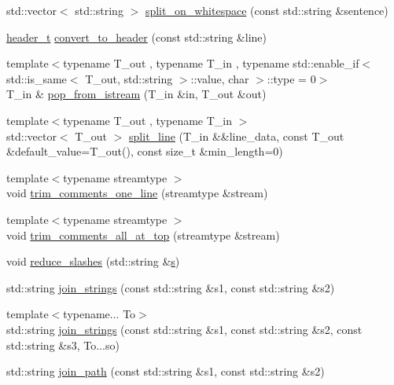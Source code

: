 \begin{DoxyCompactItemize}
\item 
std\+::vector$<$ std\+::string $>$ \hyperlink{namespaceIceBRG_aad40379211c58b53606d4bdb8bf7e4aa}{split\+\_\+on\+\_\+whitespace} (const std\+::string \&sentence)
\item 
\hyperlink{namespaceIceBRG_a49e8b48f1dbd351e9748e7cbe80705df}{header\+\_\+t} \hyperlink{namespaceIceBRG_a9f5dc0a1a78255329f619200e7dca2ac}{convert\+\_\+to\+\_\+header} (const std\+::string \&line)
\item 
{\footnotesize template$<$typename T\+\_\+out , typename T\+\_\+in , typename std\+::enable\+\_\+if$<$ std\+::is\+\_\+same$<$ T\+\_\+out, std\+::string $>$\+::value, char $>$\+::type  = 0$>$ }\\T\+\_\+in \& \hyperlink{namespaceIceBRG_a1ff20754fdcf67b62d9d29e53769f22f}{pop\+\_\+from\+\_\+istream} (T\+\_\+in \&in, T\+\_\+out \&out)
\item 
{\footnotesize template$<$typename T\+\_\+out , typename T\+\_\+in $>$ }\\std\+::vector$<$ T\+\_\+out $>$ \hyperlink{namespaceIceBRG_a7468ea3f83d5b2502eb12fd7894e4b59}{split\+\_\+line} (T\+\_\+in \&\&line\+\_\+data, const T\+\_\+out \&default\+\_\+value=T\+\_\+out(), const size\+\_\+t \&min\+\_\+length=0)
\item 
{\footnotesize template$<$typename streamtype $>$ }\\void \hyperlink{namespaceIceBRG_a349cf2523982e3a7dbbf85a19f7b2961}{trim\+\_\+comments\+\_\+one\+\_\+line} (streamtype \&stream)
\item 
{\footnotesize template$<$typename streamtype $>$ }\\void \hyperlink{namespaceIceBRG_acd00ce9e6eda20948b9394a63ef2f3c7}{trim\+\_\+comments\+\_\+all\+\_\+at\+\_\+top} (streamtype \&stream)
\item 
void \hyperlink{namespaceIceBRG_ae8113add7cad89108e48028787a7a41e}{reduce\+\_\+slashes} (std\+::string \&\hyperlink{namespaceIceBRG_ad0b9ada1ad5ccc9d88c2050483109e06}{s})
\item 
std\+::string \hyperlink{namespaceIceBRG_a4669723c2cfad096fab4c4dcac0e0db3}{join\+\_\+strings} (const std\+::string \&s1, const std\+::string \&s2)
\item 
{\footnotesize template$<$typename... To$>$ }\\std\+::string \hyperlink{namespaceIceBRG_a9852cb8b07f894ff48d4af25870bba33}{join\+\_\+strings} (const std\+::string \&s1, const std\+::string \&s2, const std\+::string \&s3, To...\+so)
\item 
std\+::string \hyperlink{namespaceIceBRG_ac55f20ecca54f7f764524d2d48242e8c}{join\+\_\+path} (const std\+::string \&s1, const std\+::string \&s2)

\end{DoxyCompactItemize}
